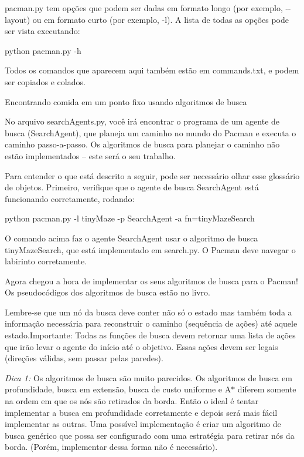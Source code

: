 {\ttfamily pacman.\+py} tem opções que podem ser dadas em formato longo (por exemplo, {\ttfamily -\/-\/layout}) ou em formato curto (por exemplo, {\ttfamily -\/l}). A lista de todas as opções pode ser vista executando\+:


\begin{DoxyCode}
python pacman.py -h
\end{DoxyCode}


Todos os comandos que aparecem aqui também estão em {\ttfamily commands.\+txt}, e podem ser copiados e colados.

Encontrando comida em um ponto fixo usando algoritmos de busca

No arquivo {\ttfamily search\+Agents.\+py}, você irá encontrar o programa de um agente de busca ({\ttfamily Search\+Agent}), que planeja um caminho no mundo do Pacman e executa o caminho passo-\/a-\/passo. Os algoritmos de busca para planejar o caminho não estão implementados -- este será o seu trabalho.

Para entender o que está descrito a seguir, pode ser necessário olhar esse glossário de objetos. Primeiro, verifique que o agente de busca Search\+Agent está funcionando corretamente, rodando\+:


\begin{DoxyCode}
python pacman.py -l tinyMaze -p SearchAgent -a fn=tinyMazeSearch
\end{DoxyCode}


O comando acima faz o agente {\ttfamily Search\+Agent} usar o algoritmo de busca {\ttfamily tiny\+Maze\+Search}, que está implementado em {\ttfamily search.\+py}. O Pacman deve navegar o labirinto corretamente.

Agora chegou a hora de implementar os seus algoritmos de busca para o Pacman! Os pseudocódigos dos algoritmos de busca estão no livro.

Lembre-\/se que um nó da busca deve conter não só o estado mas também toda a informação necessária para reconstruir o caminho (sequência de ações) até aquele estado.\+Importante\+: Todas as funções de busca devem retornar uma lista de ações que irão levar o agente do início até o objetivo. Essas ações devem ser legais (direções válidas, sem passar pelas paredes).

{\itshape Dica 1\+:} Os algoritmos de busca são muito parecidos. Os algoritmos de busca em profundidade, busca em extensão, busca de custo uniforme e A$\ast$ diferem somente na ordem em que os nós são retirados da borda. Então o ideal é tentar implementar a busca em profundidade corretamente e depois será mais fácil implementar as outras. Uma possível implementação é criar um algoritmo de busca genérico que possa ser configurado com uma estratégia para retirar nós da borda. (Porém, implementar dessa forma não é necessário).

